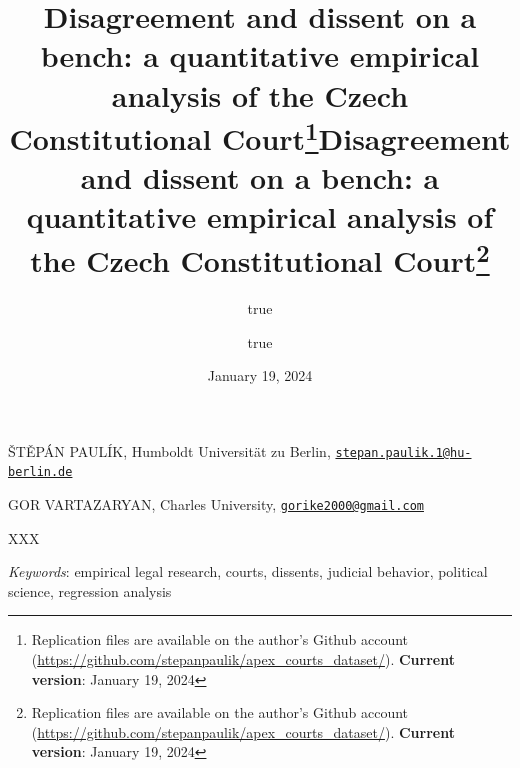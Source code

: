 \documentclass[
  11pt,
]{article}
\title{Disagreement and dissent on a bench: a quantitative empirical
analysis of the Czech Constitutional Court\thanks{Replication files are
available on the author's Github account
(\url{https://github.com/stepanpaulik/apex_courts_dataset/}).
\textbf{Current version}: January 19, 2024}}
\author{true \and true}
\date{January 19, 2024}
\title{Disagreement and dissent on a bench: a quantitative empirical
analysis of the Czech Constitutional Court\thanks{Replication files are
available on the author's Github account
(\url{https://github.com/stepanpaulik/apex_courts_dataset/}).
\textbf{Current version}: January 19, 2024}  }
\date{}
\renewenvironment{abstract}
 {{%
    \setlength{\leftmargin}{0mm}
    \setlength{\rightmargin}{\leftmargin}%
  }%
  \relax}
 {\endlist}
\begin{document}



{%
\setlength{\parindent}{0pt}
\thispagestyle{plain}
{%
\maketitle  %

}




{
   \vskip 13.5pt\relax \normalsize\fontsize{11}{12}
   \MakeUppercase{Štěpán Paulík}, \small{Humboldt Universität zu Berlin,
\href{mailto:stepan.paulik.1@hu-berlin.de}{\nolinkurl{stepan.paulik.1@hu-berlin.de}}}   \par \vskip -3.5pt \MakeUppercase{Gor
Vartazaryan}, \small{Charles University,
\href{mailto:gorike2000@gmail.com}{\nolinkurl{gorike2000@gmail.com}}}   

}

}








\begin{abstract}


    \vskip 8.5pt %

\noindent \small{XXX}


\vskip 8.5pt \noindent \emph{Keywords}: empirical legal research,
courts, dissents, judicial behavior, political science, regression
analysis \par




\end{abstract}


\vskip -8.5pt

{
\hypersetup{linkcolor=black}
\setcounter{tocdepth}{2}
\tableofcontents
}


{
\setcounter{tocdepth}{2}
\tableofcontents
}

\setlength{\parindent}{16pt}
\setlength{\parskip}{0pt}
\end{document}
